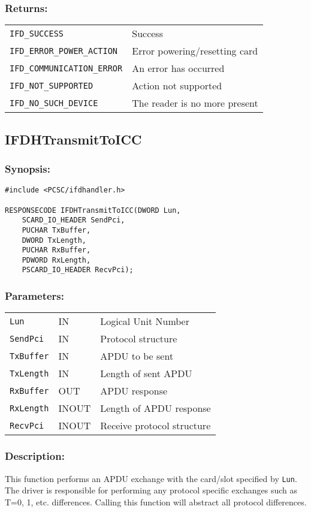 \documentclass[a4paper,12pt]{article}
\newcommand{\synopsis}{\subsubsection{Synopsis:}}
\newcommand{\parameters}{\subsubsection{Parameters:}}
\newcommand{\desc}{\subsubsection{Description:}}
\newcommand{\returns}{\subsubsection{Returns:}}
\begin{document}
\returns

\begin{tabular}{ll}
\texttt{IFD\_SUCCESS} & Success\\
\texttt{IFD\_ERROR\_POWER\_ACTION} & Error powering/resetting card\\
\texttt{IFD\_COMMUNICATION\_ERROR} & An error has occurred\\
\texttt{IFD\_NOT\_SUPPORTED} & Action not supported\\
\texttt{IFD\_NO\_SUCH\_DEVICE} & The reader is no more present\\
\end{tabular}


\subsection{IFDHTransmitToICC}

\synopsis
\begin{verbatim}
#include <PCSC/ifdhandler.h>

RESPONSECODE IFDHTransmitToICC(DWORD Lun,
    SCARD_IO_HEADER SendPci,
    PUCHAR TxBuffer,
    DWORD TxLength,
    PUCHAR RxBuffer,
    PDWORD RxLength,
    PSCARD_IO_HEADER RecvPci);
\end{verbatim}

\parameters

\begin{tabular}{lll}
\texttt{Lun} & IN & Logical Unit Number\\
\texttt{SendPci} & IN & Protocol structure\\
\texttt{TxBuffer} & IN & APDU to be sent\\
\texttt{TxLength} & IN & Length of sent APDU\\
\texttt{RxBuffer} & OUT & APDU response\\
\texttt{RxLength} & INOUT & Length of APDU response\\
\texttt{RecvPci} & INOUT & Receive protocol structure
\end{tabular}

\desc

This function performs an APDU exchange with the card/slot specified by
\texttt{Lun}. The driver is responsible for performing any protocol
specific exchanges such as T=0, 1, etc. differences. Calling this function
will abstract all protocol differences.
\end{document}
